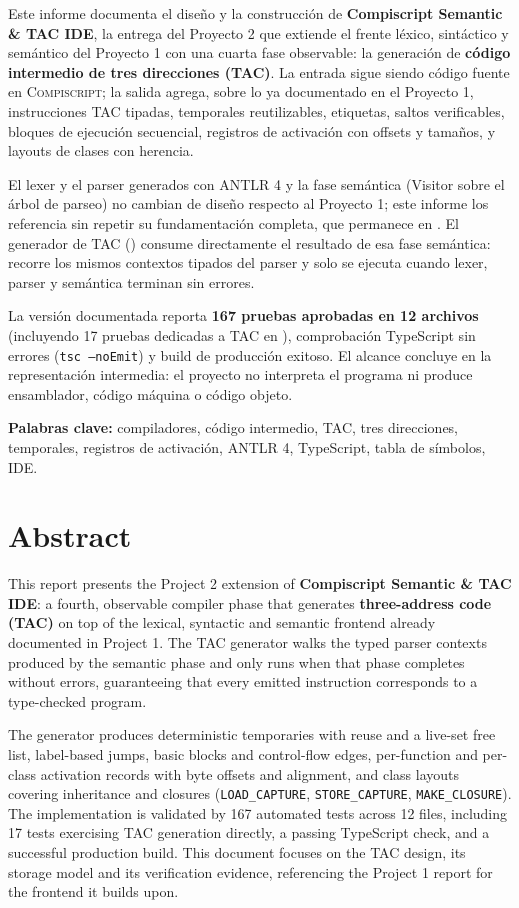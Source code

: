 \documentclass[11pt,letterpaper,oneside]{report}
\newcommand{\archivo}[1]{\path{#1}}
\newcommand{\codigo}[1]{\texttt{#1}}
\newcommand{\Compiscript}{\textsc{Compiscript}}
\newcommand{\ANTLR}{ANTLR 4}
\begin{document}
Este informe documenta el diseño y la construcción de
\textbf{Compiscript Semantic \& TAC IDE}, la entrega del Proyecto 2 que extiende el
frente léxico, sintáctico y semántico del Proyecto 1 con una cuarta fase observable:
la generación de \textbf{código intermedio de tres direcciones (TAC)}. La entrada
sigue siendo código fuente en \Compiscript{}; la salida agrega, sobre lo ya
documentado en el Proyecto 1, instrucciones TAC tipadas, temporales reutilizables,
etiquetas, saltos verificables, bloques de ejecución secuencial, registros de
activación con offsets y tamaños, y layouts de clases con herencia.

El lexer y el parser generados con \ANTLR{} y la fase semántica (Visitor sobre el
árbol de parseo) no cambian de diseño respecto al Proyecto 1; este informe los
referencia sin repetir su fundamentación completa, que permanece en
\archivo{INFORME\_PROYECTO\_01.tex}. El generador de TAC (\archivo{src/tac/}) consume
directamente el resultado de esa fase semántica: recorre los mismos contextos
tipados del parser y solo se ejecuta cuando lexer, parser y semántica terminan sin
errores.

La versión documentada reporta \textbf{167 pruebas aprobadas en 12 archivos}
(incluyendo 17 pruebas dedicadas a TAC en \archivo{tac.test.ts}), comprobación
TypeScript sin errores (\codigo{tsc --noEmit}) y build de producción exitoso. El alcance concluye en la representación
intermedia: el proyecto no interpreta el programa ni produce ensamblador, código
máquina o código objeto.

\textbf{Palabras clave:} compiladores, código intermedio, TAC, tres direcciones,
temporales, registros de activación, \ANTLR, TypeScript, tabla de símbolos, IDE.

\chapter*{Abstract}

This report presents the Project 2 extension of
\textbf{Compiscript Semantic \& TAC IDE}: a fourth, observable compiler phase that
generates \textbf{three-address code (TAC)} on top of the lexical, syntactic and
semantic frontend already documented in Project 1. The TAC generator walks the typed
parser contexts produced by the semantic phase and only runs when that phase
completes without errors, guaranteeing that every emitted instruction corresponds to
a type-checked program.

The generator produces deterministic temporaries with reuse and a live-set free
list, label-based jumps, basic blocks and control-flow edges, per-function and per-class
activation records with byte offsets and alignment, and class layouts covering
inheritance and closures (\codigo{LOAD\_CAPTURE}, \codigo{STORE\_CAPTURE},
\codigo{MAKE\_CLOSURE}). The implementation is validated by 167 automated tests
across 12 files, including 17 tests exercising TAC generation directly, a passing
TypeScript check, and a successful production build. This document focuses on the
TAC design, its storage model and its verification evidence, referencing the
Project 1 report for the frontend it builds upon.
\end{document}
